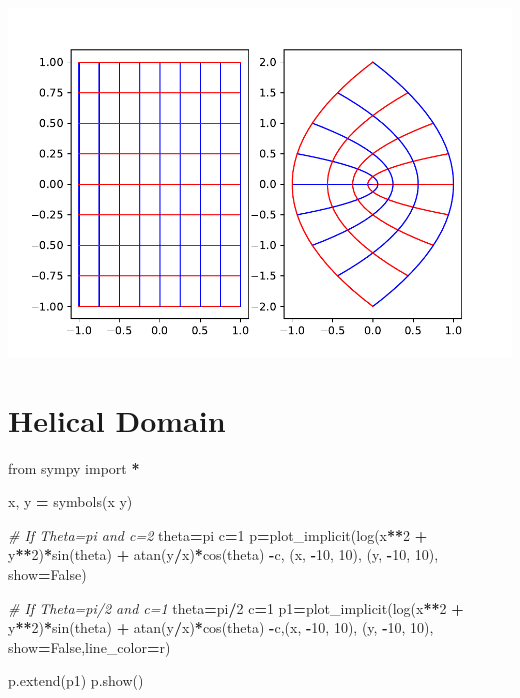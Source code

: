\documentclass[
]{book}
\newenvironment{Shaded}{\begin{snugshade}}{\end{snugshade}}
\newcommand{\CommentTok}[1]{\textcolor[rgb]{0.56,0.35,0.01}{\textit{#1}}}
\newcommand{\DecValTok}[1]{\textcolor[rgb]{0.00,0.00,0.81}{#1}}
\newcommand{\ImportTok}[1]{#1}
\newcommand{\NormalTok}[1]{#1}
\newcommand{\OperatorTok}[1]{\textcolor[rgb]{0.81,0.36,0.00}{\textbf{#1}}}
\newcommand{\StringTok}[1]{\textcolor[rgb]{0.31,0.60,0.02}{#1}}
\newcommand{\VariableTok}[1]{\textcolor[rgb]{0.00,0.00,0.00}{#1}}
\theoremstyle{definition}
\theoremstyle{definition}
\theoremstyle{definition}
\theoremstyle{definition}
\theoremstyle{remark}
\begin{document}
\includegraphics{ConformalMapping_files/figure-latex/unnamed-chunk-58-1.pdf}

\section{Helical Domain}\label{helical-domain}

\begin{Shaded}
\begin{Highlighting}[]
\ImportTok{from}\NormalTok{ sympy }\ImportTok{import} \OperatorTok{*}

\NormalTok{x, y }\OperatorTok{=}\NormalTok{ symbols(}\StringTok{\textquotesingle{}x y\textquotesingle{}}\NormalTok{)}

\CommentTok{\# If Theta=pi and c=2}
\NormalTok{theta}\OperatorTok{=}\NormalTok{pi}
\NormalTok{c}\OperatorTok{=}\DecValTok{1}
\NormalTok{p}\OperatorTok{=}\NormalTok{plot\_implicit(log(x}\OperatorTok{**}\DecValTok{2} \OperatorTok{+}\NormalTok{ y}\OperatorTok{**}\DecValTok{2}\NormalTok{)}\OperatorTok{*}\NormalTok{sin(theta) }\OperatorTok{+}\NormalTok{ atan(y}\OperatorTok{/}\NormalTok{x)}\OperatorTok{*}\NormalTok{cos(theta) }\OperatorTok{{-}}\NormalTok{c,}
\NormalTok{(x, }\OperatorTok{{-}}\DecValTok{10}\NormalTok{, }\DecValTok{10}\NormalTok{), (y, }\OperatorTok{{-}}\DecValTok{10}\NormalTok{, }\DecValTok{10}\NormalTok{), show}\OperatorTok{=}\VariableTok{False}\NormalTok{)}

\CommentTok{\# If Theta=pi/2 and c=1}
\NormalTok{theta}\OperatorTok{=}\NormalTok{pi}\OperatorTok{/}\DecValTok{2}
\NormalTok{c}\OperatorTok{=}\DecValTok{1}
\NormalTok{p1}\OperatorTok{=}\NormalTok{plot\_implicit(log(x}\OperatorTok{**}\DecValTok{2} \OperatorTok{+}\NormalTok{ y}\OperatorTok{**}\DecValTok{2}\NormalTok{)}\OperatorTok{*}\NormalTok{sin(theta) }\OperatorTok{+}\NormalTok{ atan(y}\OperatorTok{/}\NormalTok{x)}\OperatorTok{*}\NormalTok{cos(theta) }\OperatorTok{{-}}\NormalTok{c,(x, }\OperatorTok{{-}}\DecValTok{10}\NormalTok{, }\DecValTok{10}\NormalTok{), (y, }\OperatorTok{{-}}\DecValTok{10}\NormalTok{, }\DecValTok{10}\NormalTok{), show}\OperatorTok{=}\VariableTok{False}\NormalTok{,line\_color}\OperatorTok{=}\StringTok{\textquotesingle{}r\textquotesingle{}}\NormalTok{)}

\NormalTok{p.extend(p1)}
\NormalTok{p.show()}
\end{Highlighting}
\end{Shaded}
\end{document}
